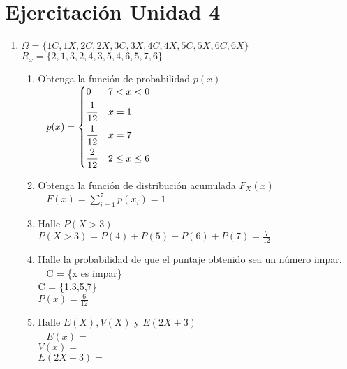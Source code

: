 \documentclass[12pt,letterpaper,fleqn]{article}
\begin{document}
    \section*{Ejercitación Unidad 4}

    \begin{enumerate}[label=\textbf{\arabic*.}]

        \item %
            $\Omega = \{1C,1X,2C,2X,3C,3X,4C,4X,5C,5X,6C,6X \}$\\
            $R_x = \{ 2 ,1 ,3 ,2, 4, 3, 5, 4, 6, 5, 7, 6 \}$
            \begin{enumerate}[label=\textbf{\alph*.}]
                \item Obtenga la función de probabilidad $ p(x) $ \\ %
                $
                     p(x)=
                        \begin{dcases}
                          0 & 7<x<0 \\
                          \frac{1}{12} & x=1\\
                          \frac{1}{12} & x=7 \\
                          \frac{2}{12} & 2\leq x \leq 6
                      \end{dcases}
                $ \\
                \item Obtenga la función de distribución acumulada $F_X(x)$ \\ %
                    $ F(x) = $$\sum_{i=1}^{7} p(x_i) = 1$$ $ \\

                \item Halle $P(X>3)$ \\%
                    $ P(X>3) = P(4)+P(5)+P(6)+P(7) = \frac{7}{12} $ \\

                \item Halle la probabilidad de que el puntaje obtenido sea un número impar. \\ %
                    C = \{x es impar\} \\
                    C = \{1,3,5,7\} \\
                    $ P(x) = \frac{6}{12} $
                    \\
                \item Halle $E(X), V(X)$ y $E(2X+3)$ \\ %
                    $ E(x) = $ \\
                    $ V(x) = $ \\
                    $ E(2X+3) = $
                    \\
            \end{enumerate}



\end{enumerate}
\end{document}
